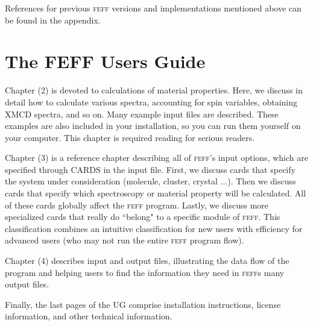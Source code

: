 \documentclass[11pt,oneside]{report} %
\renewcommand{\htmlref}[2]{\hyperlink{#2}{#1}}
\newcommand{\program}[1]{\textsc{#1}}
\newcommand{\feff}{\program{feff}}
\renewcommand{\htmlref}[2]{{#1}} %
\begin{document}
\begin{latexonly}
References for previous  {\feff} versions and implementations mentioned above can be found in the appendix.

\newpage
\section{The FEFF Users Guide}
\label{sec:UG}

%

Chapter (2) is devoted to \htmlref{calculations of material properties}{sec:Calc-Strat-Exampl}.  Here, we discuss in detail how to calculate various spectra, accounting for spin variables, obtaining XMCD spectra, and so on.  Many example input files are described.  
These examples are also included in your 
 installation, so you can run them yourself on your computer.  This chapter is required reading for serious readers.

Chapter (3) is a reference chapter describing all of \htmlref{{\feff}'s input options}{sec:Input-Control-Cards}, which are specified through CARDS in the input file.
First, we discuss cards that specify the
system under consideration (molecule, cluster, crystal ...).  Then we discuss cards that specify which spectroscopy or material property will be calculated.  All of these cards globally affect the
{\feff} program.  Lastly, we discuss more specialized cards that really do ``belong" to a specific module of {\feff}.  This classification combines an intuitive classification for new users with efficiency for advanced users (who may not run the entire {\feff} program flow).

Chapter (4) describes \htmlref{input and output files}{sec:Input-and-Output-Files}, illustrating the data flow of the program and helping users to find the information they need in {\feff}s many output files.

Finally, the last pages of the UG comprise \htmlref{installation instructions}{sec:Append-B-Inst}, license information, and other technical information.


\end{latexonly}
\end{document}
